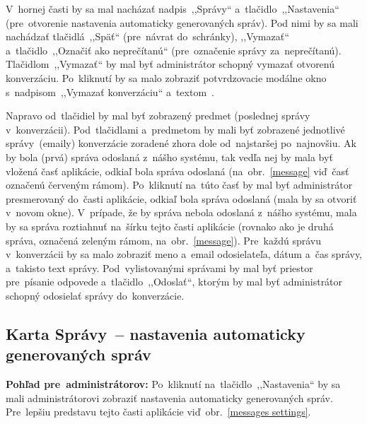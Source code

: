 V~hornej časti by sa mal nacházať nadpis~,,Správy`` a~tlačidlo~,,Nastavenia`` (pre~otvorenie nastavenia automaticky generovaných správ). Pod nimi by sa mali nachádzať tlačidlá~,,Späť`` (pre~návrat do~schránky), ,,Vymazať`` a~tlačidlo~,,Označiť ako neprečítanú`` (pre~označenie správy za~neprečítanú). Tlačidlom~,,Vymazať`` by mal byť administrátor schopný vymazať otvorenú konverzáciu. Po~kliknutí by sa malo zobraziť potvrdzovacie modálne okno s~nadpisom~,,Vymazať konverzáciu`` a~textom~.

Napravo od~tlačidiel by mal byť zobrazený predmet (poslednej správy v~konverzácii). Pod~tlačidlami a~predmetom by mali byť zobrazené jednotlivé správy~(emaily) konverzácie zoradené zhora dole od~najstaršej po~najnovšiu. Ak by bola (prvá) správa odoslaná z~nášho systému, tak vedľa nej by mala byť vložená časť aplikácie, odkiaľ bola správa odoslaná (na~obr.~\ref{message} viď~časť označenú červeným rámom). Po~kliknutí na~túto časť by mal byť administrátor presmerovaný do~časti aplikácie, odkiaľ bola správa odoslaná (mala by sa otvoriť v~novom okne). V~prípade, že by správa nebola odoslaná z~nášho systému, mala by sa správa roztiahnuť na~šírku tejto časti aplikácie (rovnako ako je druhá správa, označená zeleným rámom, na~obr.~\ref{message}). Pre~každú správu v~konverzácii by sa malo zobraziť meno a~email odosielateľa, dátum a~čas správy, a~takisto text správy. Pod~vylistovanými správami by mal byť priestor pre~písanie odpovede a~tlačidlo~,,Odoslať``, ktorým by mal byť administrátor schopný odosielať správy do~konverzácie.

\subsection{Karta Správy~-- nastavenia automaticky generovaných správ}

\textbf{Pohľad pre~administrátorov:} Po~kliknutí na~tlačidlo~,,Nastavenia`` by sa mali administrátorovi zobraziť nastavenia automaticky generovaných správ. Pre~lepšiu predstavu tejto časti aplikácie viď~obr.~\ref{messages settings}.

